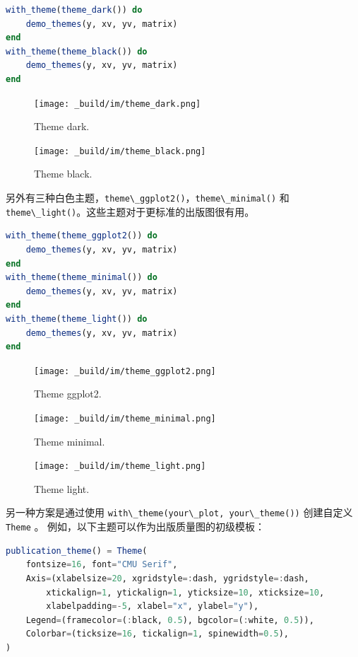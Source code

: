 \documentclass[
  notoc %
]{tufte-book}
\newcommand{\passthrough}[1]{#1}
\begin{document}
\begin{lstlisting}[language=Julia]
with_theme(theme_dark()) do
    demo_themes(y, xv, yv, matrix)
end
with_theme(theme_black()) do
    demo_themes(y, xv, yv, matrix)
end
\end{lstlisting}

\begin{figure}
\hypertarget{fig:theme_dark}{%
\centering
\texttt{[image: \_build/im/theme\_dark.png]}
\caption{Theme dark.}\label{fig:theme_dark}
}
\end{figure}

\begin{figure}
\hypertarget{fig:theme_black}{%
\centering
\texttt{[image: \_build/im/theme\_black.png]}
\caption{Theme black.}\label{fig:theme_black}
}
\end{figure}

另外有三种白色主题，\passthrough{\lstinline!theme\_ggplot2()!}，\passthrough{\lstinline!theme\_minimal()!}
和
\passthrough{\lstinline!theme\_light()!}。这些主题对于更标准的出版图很有用。

\begin{lstlisting}[language=Julia]
with_theme(theme_ggplot2()) do
    demo_themes(y, xv, yv, matrix)
end
with_theme(theme_minimal()) do
    demo_themes(y, xv, yv, matrix)
end
with_theme(theme_light()) do
    demo_themes(y, xv, yv, matrix)
end
\end{lstlisting}

\begin{figure}
\hypertarget{fig:theme_ggplot2}{%
\centering
\texttt{[image: \_build/im/theme\_ggplot2.png]}
\caption{Theme ggplot2.}\label{fig:theme_ggplot2}
}
\end{figure}

\begin{figure}
\hypertarget{fig:theme_minimal}{%
\centering
\texttt{[image: \_build/im/theme\_minimal.png]}
\caption{Theme minimal.}\label{fig:theme_minimal}
}
\end{figure}

\begin{figure}
\hypertarget{fig:theme_light}{%
\centering
\texttt{[image: \_build/im/theme\_light.png]}
\caption{Theme light.}\label{fig:theme_light}
}
\end{figure}

另一种方案是通过使用
\passthrough{\lstinline!with\_theme(your\_plot, your\_theme())!}
创建自定义 \passthrough{\lstinline!Theme!} 。
例如，以下主题可以作为出版质量图的初级模板：

\begin{lstlisting}[language=Julia]
publication_theme() = Theme(
    fontsize=16, font="CMU Serif",
    Axis=(xlabelsize=20, xgridstyle=:dash, ygridstyle=:dash,
        xtickalign=1, ytickalign=1, yticksize=10, xticksize=10,
        xlabelpadding=-5, xlabel="x", ylabel="y"),
    Legend=(framecolor=(:black, 0.5), bgcolor=(:white, 0.5)),
    Colorbar=(ticksize=16, tickalign=1, spinewidth=0.5),
)
\end{lstlisting}
\end{document}
